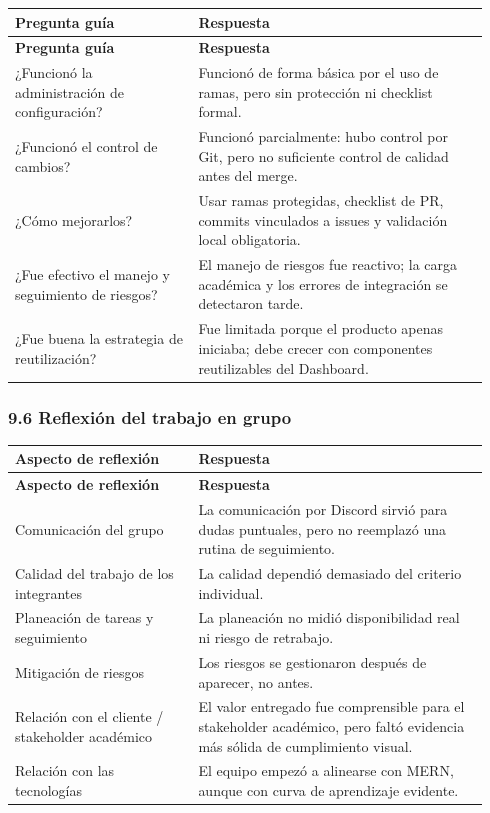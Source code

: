 \documentclass[11pt,a4paper]{article}
\begin{document}
\begingroup
\small
\setlength{\tabcolsep}{3pt}
\begin{longtable}{P{0.36\linewidth}P{0.58\linewidth}}
\toprule
\textbf{Pregunta guía} & \textbf{Respuesta} \\
\midrule
\endfirsthead
\toprule
\textbf{Pregunta guía} & \textbf{Respuesta} \\
\midrule
\endhead
\bottomrule
\endlastfoot
¿Funcionó la administración de configuración? & Funcionó de forma básica por el uso de ramas, pero sin protección ni checklist formal. \\
¿Funcionó el control de cambios? & Funcionó parcialmente: hubo control por Git, pero no suficiente control de calidad antes del merge. \\
¿Cómo mejorarlos? & Usar ramas protegidas, checklist de PR, commits vinculados a issues y validación local obligatoria. \\
¿Fue efectivo el manejo y seguimiento de riesgos? & El manejo de riesgos fue reactivo; la carga académica y los errores de integración se detectaron tarde. \\
¿Fue buena la estrategia de reutilización? & Fue limitada porque el producto apenas iniciaba; debe crecer con componentes reutilizables del Dashboard. \\
\end{longtable}
\endgroup

\subsubsection{9.6 Reflexión del trabajo en grupo}

\begingroup
\small
\setlength{\tabcolsep}{3pt}
\begin{longtable}{P{0.36\linewidth}P{0.58\linewidth}}
\toprule
\textbf{Aspecto de reflexión} & \textbf{Respuesta} \\
\midrule
\endfirsthead
\toprule
\textbf{Aspecto de reflexión} & \textbf{Respuesta} \\
\midrule
\endhead
\bottomrule
\endlastfoot
Comunicación del grupo & La comunicación por Discord sirvió para dudas puntuales, pero no reemplazó una rutina de seguimiento. \\
Calidad del trabajo de los integrantes & La calidad dependió demasiado del criterio individual. \\
Planeación de tareas y seguimiento & La planeación no midió disponibilidad real ni riesgo de retrabajo. \\
Mitigación de riesgos & Los riesgos se gestionaron después de aparecer, no antes. \\
Relación con el cliente / stakeholder académico & El valor entregado fue comprensible para el stakeholder académico, pero faltó evidencia más sólida de cumplimiento visual. \\
Relación con las tecnologías & El equipo empezó a alinearse con MERN, aunque con curva de aprendizaje evidente. \\
\end{longtable}
\endgroup
\end{document}

